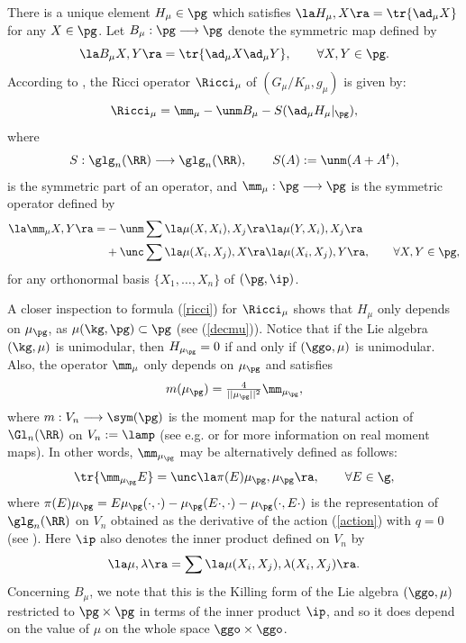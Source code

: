 \documentclass[11pt]{amsart}
\theoremstyle{plain}
\theoremstyle{definition}
\theoremstyle{remark}
\begin{document}
There is a unique element $H_{\mu}\in\pg$
which satisfies $\la H_{\mu},X\ra=\tr{\ad_\mu{X}}$ for any $X\in\pg$. Let $B_{\mu}:\pg\longrightarrow\pg$
denote the symmetric map defined by
$$
\la B_{\mu}X,Y\ra=\tr{\ad_\mu{X}\ad_\mu{Y}},\qquad\forall X,Y\in\pg.
$$
According to \cite[7.38]{Bss}, the Ricci operator $\Ricci_\mu$ of $\left(G_\mu/K_\mu,g_\mu\right)$ is given by:
\begin{equation}\label{ricci}
\Ricci_\mu=\mm_{\mu}-\unm B_{\mu}-S(\ad_{\mu}{H_{\mu}}|_{\pg}),
\end{equation}
where
\begin{equation}\label{sym}
S:\glg_n(\RR)\longrightarrow\glg_n(\RR), \qquad S(A):=\unm(A+A^t),
\end{equation}
is the symmetric part of an operator, and $\mm_{\mu}:\pg\longrightarrow\pg$ is the
symmetric operator defined by
\begin{align}\label{R}
\la \mm_{\mu}X,Y\ra =& -\unm\sum\la \mu(X,X_i),X_j\ra\la \mu(Y,X_i),X_j\ra \\
& +\unc\sum\la \mu(X_i,X_j),X\ra\la \mu(X_i,X_j),Y\ra, \qquad\forall X,Y\in\pg, \notag
\end{align}
for any orthonormal basis $\{ X_1,\dots,X_n\}$ of $(\pg,\ip)$.

A closer inspection to formula (\ref{ricci}) for $\Ricci_{\mu}$ shows that $H_{\mu}$ only depends on
$\mu_{\pg}$, as $\mu(\kg,\pg)\subset\pg$ (see (\ref{decmu})).  Notice that if the Lie algebra $(\kg,\mu)$ is unimodular, then
$H_{\mu_{\pg}}=0$ if and only if $(\ggo,\mu)$ is unimodular.  Also, the
operator $\mm_{\mu}$ only depends on $\mu_{\pg}$ and satisfies
\begin{equation}\label{mmR}
m(\mu_{\pg})=\tfrac{4}{||\mu_{\pg}||^2} \mm_{\mu_{\pg}},
\end{equation}
where $m:V_n\longrightarrow\sym(\pg)$ is the moment map for the
natural action of $\Gl_n(\RR)$ on $V_n:=\lamp$ (see e.g. \cite{HnzSchStt} or \cite{cruzchica} for more information on real moment maps).  In other words,
$\mm_{\mu_{\pg}}$ may be alternatively defined as follows:
\begin{equation}\label{Rmm}
\tr{\mm_{\mu_{\pg}}E}=\unc\la\pi(E)\mu_{\pg},\mu_{\pg}\ra, \qquad\forall
E\in\g,
\end{equation}
where $\pi(E)\mu_{\pg}=E\mu_{\pg}(\cdot,\cdot)-\mu_{\pg}(E\cdot,\cdot)-\mu_{\pg}(\cdot,E\cdot)$ is the representation of $\glg_n(\RR)$ on $V_n$ obtained as the derivative of the action (\ref{action}) with $q=0$ (see \cite[Proposition 3.5]{minimal}).  Here $\ip$ also denotes the inner product defined on $V_n$ by
\begin{equation}\label{innV}
\la\mu,\lambda\ra= \sum\la\mu(X_i,X_j),\lambda(X_i,X_j)\ra.
\end{equation}
Concerning $B_{\mu}$, we note that this is the Killing form of the Lie algebra $(\ggo,\mu)$ restricted to $\pg\times\pg$ in terms of the inner product $\ip$, and so it does depend on the value of $\mu$ on the whole space $\ggo\times\ggo$.
\end{document}
